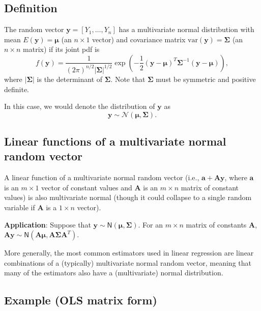 \documentclass[
]{book}
\theoremstyle{definition}
\theoremstyle{definition}
\theoremstyle{definition}
\theoremstyle{definition}
\theoremstyle{remark}
\begin{document}
\hypertarget{definition-1}{%
\subsection{Definition}\label{definition-1}}

The random vector \(\mathbf{y}=[Y_1,\dots,Y_n]\) has a multivariate normal distribution with mean \(E(\mathbf{y})=\boldsymbol{\mu}\) (an \(n\times 1\) vector) and covariance matrix \(\mathrm{var}(\mathbf{y})=\boldsymbol{\Sigma}\) (an \(n\times n\) matrix) if its joint pdf is
\[
f(\mathbf{y})=\frac{1}{(2\pi)^{n/2} |\boldsymbol{\Sigma}|^{1/2} }  \exp\left(-\frac{1}{2} (\mathbf{y}-\boldsymbol{\mu})^T \boldsymbol{\Sigma}^{-1} (\mathbf{y}-\boldsymbol{\mu})\right),
\]
where \(|\boldsymbol{\Sigma}|\) is the determinant of \(\boldsymbol{\Sigma}\). Note that \(\boldsymbol{\Sigma}\) must be symmetric and positive definite.

In this case, we would denote the distribution of \(\mathbf{y}\) as \[\mathbf{y}\sim \mathcal{N}(\boldsymbol{\mu},\boldsymbol{\Sigma}).\]

\hypertarget{linear-functions-of-a-multivariate-normal-random-vector}{%
\subsection{Linear functions of a multivariate normal random vector}\label{linear-functions-of-a-multivariate-normal-random-vector}}

A linear function of a multivariate normal random vector (i.e., \(\mathbf{a}+\mathbf{A}\mathbf{y}\), where \(\mathbf{a}\) is an \(m\times 1\) vector of constant values and \(\mathbf{A}\) is an \(m\times n\) matrix of constant values) is also multivariate normal (though it could collapse to a single random variable if \(\mathbf{A}\) is a \(1\times n\) vector).

\textbf{Application}: Suppose that \(\mathbf{y}\sim \mathsf{N}(\boldsymbol{\mu},\boldsymbol{\Sigma})\). For an \(m\times n\) matrix of constants \(\mathbf{A}\), \(\mathbf{A}\mathbf{y}\sim \mathsf{N}(\mathbf{A}\boldsymbol{\mu},\mathbf{A}\boldsymbol{\Sigma} \mathbf{A}^T)\).

More generally, the most common estimators used in linear regression are linear combinations of a (typically) multivariate normal random vector, meaning that many of the estimators also have a (multivariate) normal distribution.

\hypertarget{example-ols-matrix-form}{%
\subsection{Example (OLS matrix form)}\label{example-ols-matrix-form}}
\end{document}
